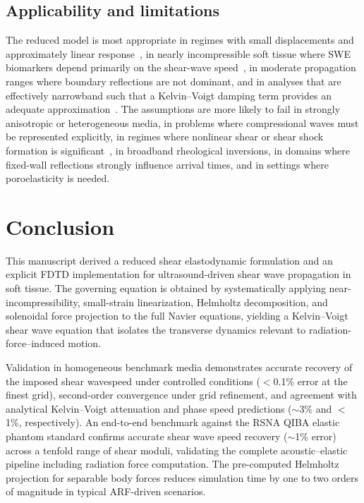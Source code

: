 \documentclass{iopjournal}
\begin{document}
\subsection{Applicability and limitations}
The reduced model is most appropriate in regimes with small displacements and
approximately linear
response~\cite{sarvazyan1998elasticity}, in nearly incompressible soft tissue
where SWE biomarkers depend primarily on the shear-wave
speed~\cite{sandrin2003transient,tanter2008quantitative,barr2015elastography},
in moderate propagation ranges where boundary reflections are not dominant, and
in analyses that are effectively narrowband such that a Kelvin--Voigt damping
term provides an adequate
approximation~\cite{catheline2004viscoelastic}.
The assumptions are more likely to fail in strongly anisotropic or
heterogeneous media, in problems where compressional waves must be represented
explicitly, in regimes where nonlinear shear or shear shock formation is
significant~\cite{tripathi2017shearshock,espindola2017shearshock}, in broadband
rheological inversions, in domains where fixed-wall reflections strongly
influence arrival times, and in settings where poroelasticity is needed.


\section{Conclusion}
\label{sec:conclusion}

This manuscript derived a reduced shear elastodynamic formulation and an
explicit FDTD implementation for ultrasound-driven shear wave propagation in
soft tissue. The governing equation is obtained by systematically applying
near-incompressibility, small-strain linearization, Helmholtz decomposition,
and solenoidal force projection to the full Navier equations, yielding a
Kelvin--Voigt shear wave equation that isolates the transverse dynamics relevant
to radiation-force--induced motion.

Validation in homogeneous benchmark media demonstrates accurate recovery of the
imposed shear wavespeed under controlled conditions ($<$0.1\% error at the
finest grid), second-order convergence under grid refinement, and agreement with
analytical Kelvin--Voigt attenuation and phase speed predictions (${\sim}$3\%
and $<$1\%, respectively). An end-to-end benchmark against the RSNA QIBA
elastic phantom standard confirms accurate shear wave speed recovery
(${\sim}$1\% error) across a tenfold range of shear moduli, validating the
complete acoustic--elastic pipeline including radiation force computation.
The pre-computed Helmholtz projection for separable
body forces reduces simulation time by one to two orders of magnitude in
typical ARF-driven scenarios.
\end{document}
